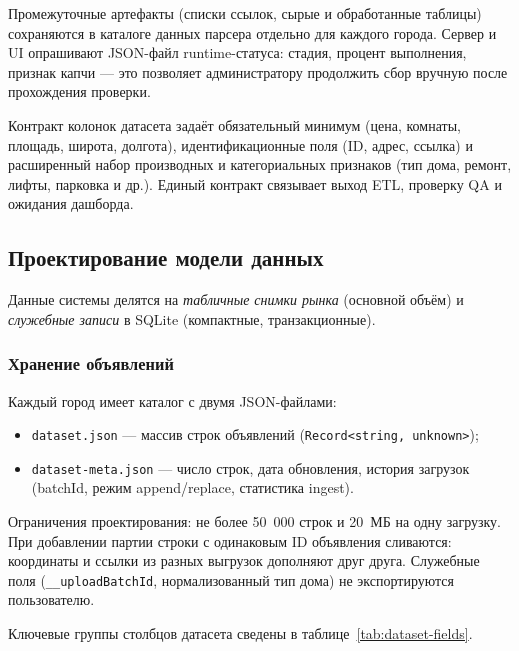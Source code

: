 Промежуточные артефакты (списки ссылок, сырые и обработанные таблицы) сохраняются в каталоге данных парсера отдельно для каждого города. Сервер и UI опрашивают JSON-файл runtime-статуса: стадия, процент выполнения, признак капчи --- это позволяет администратору продолжить сбор вручную после прохождения проверки.

Контракт колонок датасета задаёт обязательный минимум (цена, комнаты, площадь, широта, долгота), идентификационные поля (ID, адрес, ссылка) и расширенный набор производных и категориальных признаков (тип дома, ремонт, лифты, парковка и др.). Единый контракт связывает выход ETL, проверку QA и ожидания дашборда.

\subsection{Проектирование модели данных}

Данные системы делятся на \emph{табличные снимки рынка} (основной объём) и \emph{служебные записи} в SQLite (компактные, транзакционные).

\subsubsection{Хранение объявлений}

Каждый город имеет каталог с двумя JSON-файлами:
\begin{itemize}
    \item \texttt{dataset.json} --- массив строк объявлений (\texttt{Record<string, unknown>});
    \item \texttt{dataset-meta.json} --- число строк, дата обновления, история загрузок (batchId, режим append/replace, статистика ingest).
\end{itemize}

Ограничения проектирования: не более 50~000 строк и 20~МБ на одну загрузку. При добавлении партии строки с одинаковым ID объявления сливаются: координаты и ссылки из разных выгрузок дополняют друг друга. Служебные поля (\texttt{\_\_uploadBatchId}, нормализованный тип дома) не экспортируются пользователю.

Ключевые группы столбцов датасета сведены в таблице~\ref{tab:dataset-fields}.

